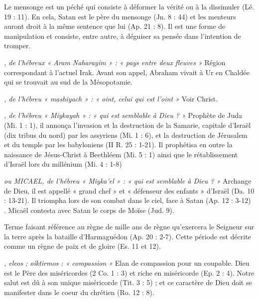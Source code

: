 \begin{multicols}{2}
\textit{}\newline
Le mensonge est un péché qui consiste à déformer la vérité ou à la dissimuler (Lé. 19 : 11). En cela, Satan est le père du mensonge (Jn. 8 : 44) et les menteurs auront droit à la même sentence que lui (Ap. 21 : 8). Il est une forme de manipulation et consiste, entre autre, à déguiser sa pensée dans l'intention de tromper.

\textit{, de l'hébreux « Aram Naharayim » : « pays entre deux fleuves »}\newline
Région correspondant à l'actuel Irak. Avant son appel, Abraham vivait à Ur en Chaldée qui se trouvait au sud de la Mésopotamie.

\textit{, de l'hébreu « mashiyach » : « oint, celui qui est l'oint »}\newline
Voir Christ.

\textit{, de l'hébreu « Miykayah » : « qui est semblable à Dieu ? »}\newline
Prophète de Juda (Mi. 1 : 1), il annonça l'invasion et la destruction de la Samarie, capitale d'Israël (dix tribus du nord) par les assyriens (Mi. 1 : 6), et la destruction de Jérusalem et du temple par les babyloniens (II R. 25 : 1-21). Il prophétisa en outre la naissance de Jésus-Christ à Beethléem (Mi. 5 : 1) ainsi que le rétablissement d'Israël lors du millénium (Mi. 4 : 1-8)

\textit{ou MICAEL, de l'hébreu « Miyka'el » : « qui est semblable à Dieu ? »}\newline
Archange de Dieu, il est appellé « grand chef » et « défenseur des enfants » d'Israël (Da. 10 : 13-21). Il triompha lors de son combat dans le ciel, face à Satan (Ap. 12 : 3-12) . Micaël contesta avec Satan le corps de Moïse (Jud. 9).

\textit{}\newline
Terme faisant référence au règne de mille ans de règne qu'exercera le Seigneur sur la terre après la bataille d'Harmaguédon (Ap. 20 : 2-7). Cette période est décrite comme un règne de paix et de gloire (Es. 11 et 12).

\textit{, eleos ; oiktirmos : « compassion »}\newline
Elan de compassion pour un coupable. Dieu est le Père des miséricordes (2 Co. 1 : 3) et riche en miséricorde (Ep. 2 : 4). Notre salut est dû à son unique miséricorde (Tit. 3 : 5) ; et ce caractère de Dieu doit se manifester dans le coeur du chrétien (Ro. 12 : 8).


\end{multicols}
